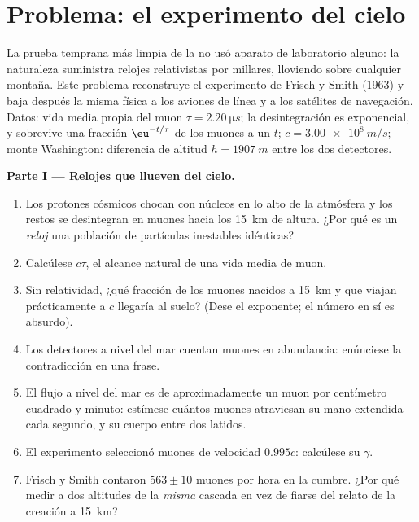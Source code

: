 \section{Problema: el experimento del cielo}

\begin{problem}\label{pb:b3:relativistic-kinematics:1}
La prueba temprana más limpia de la  no usó aparato de
laboratorio alguno: la naturaleza suministra relojes relativistas por
millares, lloviendo sobre cualquier montaña. Este problema reconstruye el
experimento de Frisch y Smith (1963) y baja después la misma física a los
aviones de línea y a los satélites de navegación. Datos: vida media propia
del muon $\tau =
\qty{2.20}{\micro s}$; la desintegración es exponencial, y sobrevive una
fracción $\eu^{-t/\tau}$ de los muones a un  $t$; $c =
\qty{3.00e8}{m/s}$; monte Washington: diferencia de altitud $h =
\qty{1907}{m}$ entre los dos detectores.

\medskip\noindent\textbf{Parte I --- Relojes que llueven del cielo.}
\begin{enumerate}
  \item Los protones cósmicos chocan con núcleos en lo alto de la
        atmósfera y los restos se desintegran en muones hacia los
        \qty{15}{km} de altura. ¿Por qué es un \emph{reloj} una
        población de partículas inestables idénticas?
  \item Calcúlese $c\tau$, el alcance natural de una vida media de muon.
  \item Sin relatividad, ¿qué fracción de los muones nacidos a
        \qty{15}{km} y que viajan prácticamente a $c$ llegaría al
        suelo? (Dese el exponente; el número en sí es absurdo).
  \item Los detectores a nivel del mar cuentan muones en abundancia:
        enúnciese la contradicción en una frase.
  \item El flujo a nivel del mar es de aproximadamente un muon por
        centímetro cuadrado y minuto: estímese cuántos muones atraviesan
        su mano extendida cada segundo, y su cuerpo entre dos latidos.
  \item El experimento seleccionó muones de velocidad $0.995c$: calcúlese
        su $\gamma$.
  \item Frisch y Smith contaron $563 \pm 10$ muones por hora en la
        cumbre. ¿Por qué medir a dos altitudes de la \emph{misma}
        cascada en vez de fiarse del relato de la creación a
        \qty{15}{km}?
\end{enumerate}


\end{problem}
